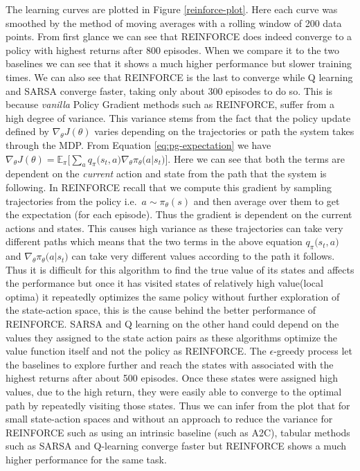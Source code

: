 \documentclass[14pt]{extarticle}
\numberwithin{equation}{section}
\begin{document}
The learning curves are plotted in Figure \ref{reinforce-plot}. Here each curve was smoothed by the method of moving averages with a rolling window of 200 data points. From first glance we can see that REINFORCE does indeed converge to a policy with highest returns after 800 episodes. When we compare it to the two baselines we can see that it shows a much higher performance but slower training times. We can also see that REINFORCE is the last to converge while Q learning and SARSA converge  faster, taking only about 300 episodes to do so. This is because \textit{vanilla} Policy Gradient methods such as REINFORCE, suffer from a high degree of variance. This variance stems from the fact that the policy update defined by $\nabla_{\theta}J(\theta)$ varies depending on the trajectories or path the system takes through the MDP. From Equation \ref{eq:pg-expectation} we have $\nabla_{\theta}J(\theta)=\mathbb{E}_{\pi}\big[\sum_{a}q_{\pi}\big(s_t,a\big)\nabla_{\theta}\pi_{\theta}\big(a|s_t\big)\big]$. Here we can see that both the terms are dependent on the \textit{current} action and state from the path that the system is following. In REINFORCE recall that we compute this gradient by sampling trajectories from the policy i.e.\ $a \sim \pi_{\theta}(s)$ and then average over them to get the expectation (for each episode). Thus the gradient is dependent on the current actions and states. This causes high variance as these trajectories can take very different paths which means that the two terms in the above equation $q_{\pi}\big(s_t,a\big)$ and $\nabla_{\theta}\pi_{\theta}\big(a|s_t\big)$ can take very different values according to the path it follows. Thus it is difficult for this algorithm to find the true value of its states and affects the performance but once it has visited states of relatively high value(local optima) it repeatedly optimizes the same policy without further exploration of the state-action space, this is the cause behind the better performance of REINFORCE. SARSA and Q learning on the other hand could depend on the values they assigned to the state action pairs as these algorithms optimize the value function itself and not the policy as REINFORCE. The $\epsilon$-greedy process let the baselines to explore further and reach the states with associated with the highest returns after about 500 episodes. Once these states were assigned high values, due to the high return, they were easily  able to converge to the optimal path by repeatedly visiting those states. Thus we can infer from the plot that for small state-action spaces and without an approach to reduce the variance for REINFORCE such as using an intrinsic baseline (such as A2C), tabular methods such as SARSA and Q-learning converge faster but REINFORCE shows a much higher performance for the same task.
\end{document}
